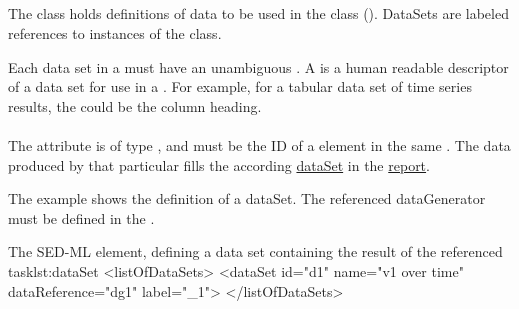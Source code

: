 \begin{blockChanged}
\subsection{}
\label{class:dataSet}
The \DataSet class holds definitions of data to be used in the \Report class (). DataSets are labeled references to instances of the \DataGenerator class.

Each data set in a \Report must have an unambiguous . A  is a human readable descriptor of a data set for use in a \Report. For example, for a tabular data set of time series results, the  could be the column heading. 

\paragraph*{}
\label{sec:dataReference}
The  attribute is of type , and must be the ID of a \DataGenerator element in the same \SedDocument.  The data produced by that particular \DataGenerator fills the according \hyperref[class:dataSet]{dataSet} in the \hyperref[class:report]{report}.

The example shows the definition of a dataSet. The referenced dataGenerator  must be defined in the \hyperref[sec:listOfDataGenerators]{}.
\begin{myXmlLst}{The SED-ML  element, defining a data set containing the result of the referenced task}{lst:dataSet}
<listOfDataSets>
	<dataSet id="d1" name="v1 over time" dataReference="dg1" label="_1">
</listOfDataSets>
\end{myXmlLst}


\end{blockChanged}


